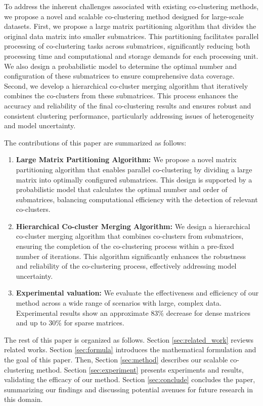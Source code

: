 To address the inherent challenges associated with existing co-clustering methods, we propose a novel and scalable co-clustering method designed for large-scale datasets. First,  we propose a large matrix partitioning algorithm that divides the original data matrix into smaller submatrices. This partitioning facilitates parallel processing of co-clustering tasks across submatrices, significantly reducing both processing time and computational and storage demands for each processing unit. We also design a probabilistic model to determine the optimal number and configuration of these submatrices to ensure comprehensive data coverage.
Second, we develop a hierarchical co-cluster merging algorithm that iteratively combines the co-clusters from these submatrices. This process enhances the accuracy and reliability of the final co-clustering results and ensures robust and consistent clustering performance, particularly addressing issues of heterogeneity and model uncertainty.

The contributions of this paper are summarized as follows:
\begin{enumerate}
    \item \textbf{Large Matrix Partitioning Algorithm:}
          We propose a novel matrix partitioning algorithm that enables parallel co-clustering by dividing a large matrix into optimally configured submatrices. This design is supported by a probabilistic model that calculates the optimal number and order of submatrices, balancing computational efficiency with the detection of relevant co-clusters.
    \item \textbf{Hierarchical Co-cluster Merging Algorithm:}
          We design a hierarchical co-cluster merging algorithm that combines co-clusters from submatrices, ensuring the completion of the co-clustering process within a pre-fixed number of iterations. This algorithm significantly enhances the robustness and reliability of the co-clustering process, effectively addressing model uncertainty.
    \item \textbf{Experimental valuation:}
          We evaluate the effectiveness and efficiency of our method across a wide range of scenarios with large, complex data. Experimental results show an approximate 83\% decrease for dense matrices and up to 30\% for sparse matrices.
\end{enumerate}

The rest of this paper is organized as follows. Section \ref{sec:related_work} reviews related works. Section \ref{sec:formula} introduces the mathematical formulation and the goal of this paper. Then, Section \ref{sec:method} describes our scalable co-clustering method. Section \ref{sec:experiment} presents experiments and results, validating the efficacy of our method. Section \ref{sec:conclude} concludes the paper, summarizing our findings and discussing potential avenues for future research in this domain.

